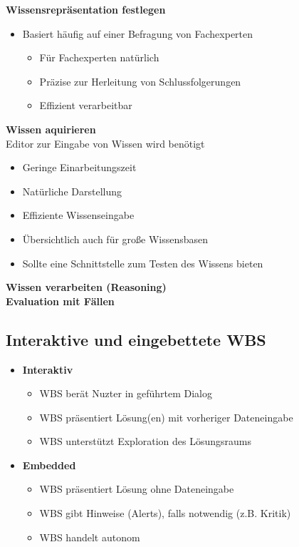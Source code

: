 \documentclass[14pt]{article}
\begin{document}
    \textbf{Wissensrepräsentation festlegen} \\
    \begin{itemize}
        \item Basiert häufig auf einer Befragung von Fachexperten
        \begin{itemize}
            \item Für Fachexperten natürlich
            \item Präzise zur Herleitung von Schlussfolgerungen
            \item Effizient verarbeitbar
        \end{itemize}
    \end{itemize}
    \textbf{Wissen aquirieren} \\
    Editor zur Eingabe von Wissen wird benötigt
    \begin{itemize}
        \item Geringe Einarbeitungszeit
        \item Natürliche Darstellung
        \item Effiziente Wissenseingabe
        \item Übersichtlich auch für große Wissensbasen
        \item Sollte eine Schnittstelle zum Testen des Wissens bieten
    \end{itemize}
    \textbf{Wissen verarbeiten (Reasoning)} \\
    \textbf{Evaluation mit Fällen}

    \subsection{Interaktive und eingebettete WBS}
    \begin{itemize}
        \item \textbf{Interaktiv}
        \begin{itemize}
            \item WBS berät Nuzter in geführtem Dialog
            \item WBS präsentiert Lösung(en) mit vorheriger 
            Dateneingabe
            \item WBS unterstützt Exploration des Lösungsraums
        \end{itemize}
        \item \textbf{Embedded}
        \begin{itemize}
            \item WBS präsentiert Lösung ohne Dateneingabe
            \item WBS gibt Hinweise (Alerts), falls notwendig 
            (z.B. Kritik)
            \item WBS handelt autonom
        \end{itemize}
    \end{itemize}
\end{document}
